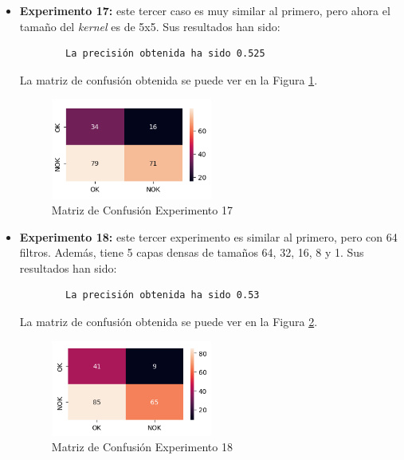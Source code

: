 \begin{itemize}
    \item \textbf{Experimento 17:} este tercer caso es muy similar al primero, pero ahora el tamaño del \emph{kernel} es de 5x5. Sus resultados han sido:
    \begin{verbatim}
        La precisión obtenida ha sido 0.525
    \end{verbatim}
    La matriz de confusión obtenida se puede ver en la Figura \ref{f:exp17}.
    \begin{figure}[h]
     \centering
      \includegraphics[width=0.5\textwidth]{img/exp17.PNG}
     \caption{Matriz de Confusión Experimento 17}
     \label{f:exp17}
    \end{figure}
    
    \item \textbf{Experimento 18:} este tercer experimento es similar al primero, pero con 64 filtros. Además, tiene 5 capas densas de tamaños 64, 32, 16, 8 y 1. Sus resultados han sido:
    \begin{verbatim}
        La precisión obtenida ha sido 0.53
    \end{verbatim}
    La matriz de confusión obtenida se puede ver en la Figura \ref{f:exp18}.
    \begin{figure}[h]
     \centering
      \includegraphics[width=0.5\textwidth]{img/exp18.PNG}
     \caption{Matriz de Confusión Experimento 18}
     \label{f:exp18}
    \end{figure}
    

\end{itemize}
